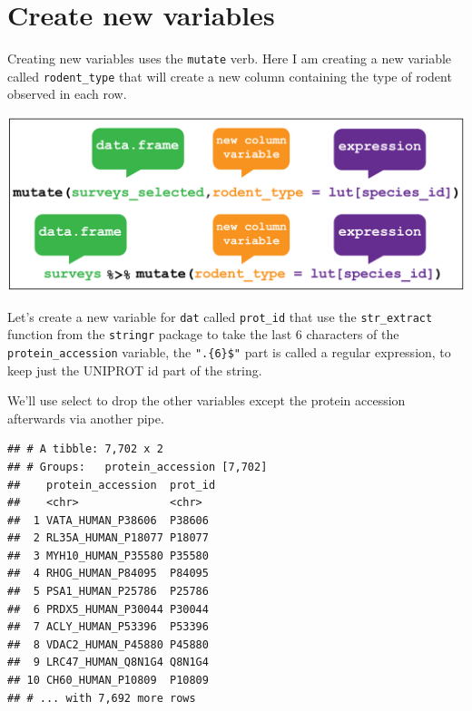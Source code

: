\documentclass[12pt,]{book}
\newenvironment{Shaded}{\begin{snugshade}}{\end{snugshade}}
\newcommand{\KeywordTok}[1]{\textcolor[rgb]{0.13,0.29,0.53}{\textbf{#1}}}
\newcommand{\DataTypeTok}[1]{\textcolor[rgb]{0.13,0.29,0.53}{#1}}
\newcommand{\StringTok}[1]{\textcolor[rgb]{0.31,0.60,0.02}{#1}}
\newcommand{\OperatorTok}[1]{\textcolor[rgb]{0.81,0.36,0.00}{\textbf{#1}}}
\newcommand{\NormalTok}[1]{#1}
\theoremstyle{definition}
\theoremstyle{definition}
\theoremstyle{definition}
\theoremstyle{remark}
\begin{document}
\section{Create new variables}\label{mutate}

Creating new variables uses the \texttt{mutate} verb. Here I am creating
a new variable called \texttt{rodent\_type} that will create a new
column containing the type of rodent observed in each row.

\begin{center}\includegraphics[width=0.8\linewidth]{img/dplyr_mutate} \end{center}

Let's create a new variable for \texttt{dat} called \texttt{prot\_id}
that use the \texttt{str\_extract} function from the \texttt{stringr}
package to take the last 6 characters of the \texttt{protein\_accession}
variable, the \texttt{".\{6\}\$"} part is called a regular expression,
to keep just the UNIPROT id part of the string.

We'll use select to drop the other variables except the protein
accession afterwards via another pipe.

\begin{Shaded}
\end{Shaded}

\begin{verbatim}
## # A tibble: 7,702 x 2
## # Groups:   protein_accession [7,702]
##    protein_accession  prot_id
##    <chr>              <chr>  
##  1 VATA_HUMAN_P38606  P38606 
##  2 RL35A_HUMAN_P18077 P18077 
##  3 MYH10_HUMAN_P35580 P35580 
##  4 RHOG_HUMAN_P84095  P84095 
##  5 PSA1_HUMAN_P25786  P25786 
##  6 PRDX5_HUMAN_P30044 P30044 
##  7 ACLY_HUMAN_P53396  P53396 
##  8 VDAC2_HUMAN_P45880 P45880 
##  9 LRC47_HUMAN_Q8N1G4 Q8N1G4 
## 10 CH60_HUMAN_P10809  P10809 
## # ... with 7,692 more rows
\end{verbatim}
\end{document}
